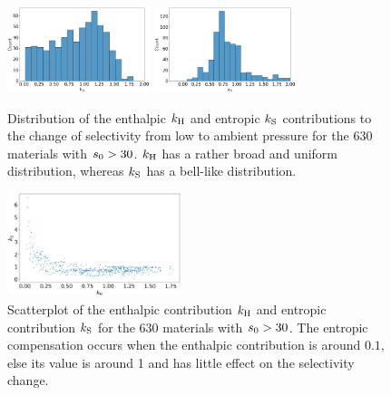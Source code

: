 \documentclass[main.tex]{subfiles}
\begin{document}
\begin{figure}[t]
  \centering
    \includegraphics[width=0.37\textwidth]{figures/2-thermo/k_H.jpg}
    \hspace{8mm}
    \includegraphics[width=0.37\textwidth]{figures/2-thermo/k_S.jpg}
    \caption{Distribution of the enthalpic $k_{\text{H}}$ and entropic $k_{\text{S}}$ contributions to the change of selectivity from low to ambient pressure for the 630 materials with $s_{\text{0}}>30$. $k_{\text{H}}$ has a rather broad and uniform distribution, whereas $k_{\text{S}}$ has a bell-like distribution. }\label{fgr:distk}
\end{figure}

\begin{figure}[t]
\centering
  \includegraphics[width=0.45\textwidth]{figures/2-thermo/k_S_vs_k_H.jpg}
  \caption{Scatterplot of the enthalpic contribution $k_{\text{H}}$ and entropic contribution $k_{\text{S}}$ for the 630 materials with $s_{\text{0}}>30$. The entropic compensation occurs when the enthalpic contribution is around $0.1$, else its value is around 1 and has little effect on the selectivity change.}\label{fgr:scatterk}
\end{figure}
  
\end{document}
